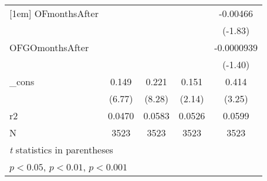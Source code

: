 \begin{table}[htbp]
\begin{tabular}{l*{4}{c}}
[1em]
OFmonthsAfter&                     &                     &                     &    -0.00466         \\
            &                     &                     &                     &     (-1.83)         \\
[1em]
OFGOmonthsAfter&                     &                     &                     &  -0.0000939         \\
            &                     &                     &                     &     (-1.40)         \\
[1em]
\_cons      &       0.149\sym{***}&       0.221\sym{***}&       0.151\sym{*}  &       0.414\sym{**} \\
            &      (6.77)         &      (8.28)         &      (2.14)         &      (3.25)         \\
\hline
r2          &      0.0470         &      0.0583         &      0.0526         &      0.0599         \\
N           &        3523         &        3523         &        3523         &        3523         \\
\hline\hline
\multicolumn{5}{l}{\footnotesize \textit{t} statistics in parentheses}\\
\multicolumn{5}{l}{\footnotesize \sym{*} \(p<0.05\), \sym{**} \(p<0.01\), \sym{***} \(p<0.001\)}\\
\end{tabular}
\end{table}
